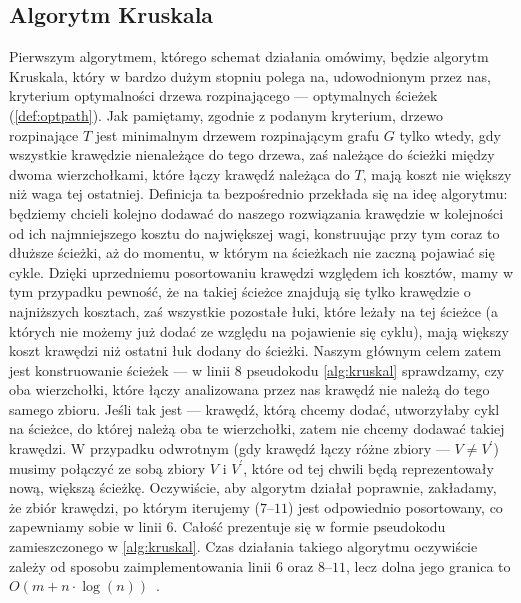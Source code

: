 \subsection{Algorytm Kruskala}

Pierwszym algorytmem, którego schemat działania omówimy, będzie algorytm Kruskala, który w bardzo dużym stopniu polega na, udowodnionym przez nas, kryterium optymalności drzewa rozpinającego --- optymalnych ścieżek (\ref{def:optpath}). Jak pamiętamy, zgodnie z podanym kryterium, drzewo rozpinające $T$ jest minimalnym drzewem rozpinającym grafu $G$ tylko wtedy, gdy wszystkie krawędzie nienależące do tego drzewa, zaś należące do ścieżki między dwoma wierzchołkami, które łączy krawędź należąca do $T$, mają koszt nie większy niż waga tej ostatniej. Definicja ta bezpośrednio przekłada się na ideę algorytmu: będziemy chcieli kolejno dodawać do naszego rozwiązania krawędzie w kolejności od ich najmniejszego kosztu do największej wagi, konstruując przy tym coraz to dłuższe ścieżki, aż do momentu, w którym na ścieżkach nie zaczną pojawiać się cykle. Dzięki uprzedniemu posortowaniu krawędzi względem ich kosztów, mamy w tym przypadku pewność, że na takiej ścieżce znajdują się tylko krawędzie o najniższych kosztach, zaś wszystkie pozostałe łuki, które leżały na tej ścieżce (a których nie możemy już dodać ze względu na pojawienie się cyklu), mają większy koszt krawędzi niż ostatni łuk dodany do ścieżki. Naszym głównym celem zatem jest konstruowanie ścieżek --- w linii $8$ pseudokodu \ref{alg:kruskal} sprawdzamy, czy oba wierzchołki, które łączy analizowana przez nas krawędź nie należą do tego samego zbioru. Jeśli tak jest --- krawędź, którą chcemy dodać, utworzyłaby cykl na ścieżce, do której należą oba te wierzchołki, zatem nie chcemy dodawać takiej krawędzi. W przypadku odwrotnym (gdy krawędź łączy różne zbiory --- $V \neq V^{\prime}$) musimy połączyć ze sobą zbiory $V$ i $V^{\prime}$, które od tej chwili będą reprezentowały nową, większą ścieżkę. Oczywiście, aby algorytm działał poprawnie, zakładamy, że zbiór krawędzi, po którym iterujemy ($7$--$11$) jest odpowiednio posortowany, co zapewniamy sobie w linii $6$. Całość prezentuje się w formie pseudokodu zamieszczonego w \ref{alg:kruskal}. Czas działania takiego algorytmu oczywiście zależy od sposobu zaimplementowania linii $6$ oraz $8$--$11$, lecz dolna jego granica to $O \left( m + n \cdot \log \left( n \right) \right)$~\cite[$522$]{Ahuja:1993:NFT:137406}.

